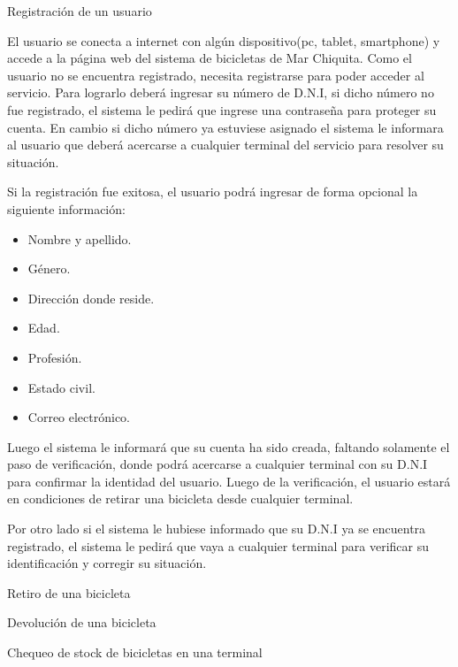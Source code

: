 
\begin{subsection}{Registración de un usuario}

El usuario se conecta a internet con algún dispositivo(pc, tablet, smartphone) y accede a la página
web del sistema de bicicletas de Mar Chiquita. Como el usuario no se encuentra registrado, necesita 
registrarse para poder acceder al servicio. Para lograrlo deberá ingresar su número de D.N.I, si dicho
número no fue registrado, el sistema le pedirá que ingrese una contraseña para proteger su cuenta. En cambio
si dicho número ya estuviese asignado el sistema le informara al usuario que deberá acercarse a cualquier
terminal del servicio para resolver su situación.

Si la registración fue exitosa, el usuario podrá ingresar de forma opcional la siguiente información:
	\begin{itemize}
	\item Nombre y apellido.
	\item Género.
	\item Dirección donde reside.
	\item Edad.
	\item Profesión.
	\item Estado civil.
	\item Correo electrónico.
	\end{itemize}

Luego el sistema le informará que su cuenta ha sido creada, faltando solamente el paso de verificación, donde
podrá acercarse a cualquier terminal con su D.N.I para confirmar la identidad del usuario. Luego de la 
verificación, el usuario estará en condiciones de retirar una bicicleta desde cualquier terminal.

Por otro lado si el sistema le hubiese informado que su D.N.I ya se encuentra registrado, el sistema le pedirá
que vaya a cualquier terminal para verificar su identificación y corregir su situación.
\end{subsection} 

\begin{subsection}{Retiro de una bicicleta}

\end{subsection} 

\begin{subsection}{Devolución de una bicicleta}

\end{subsection}

\begin{subsection}{Chequeo de stock de bicicletas en una terminal}

\end{subsection}

